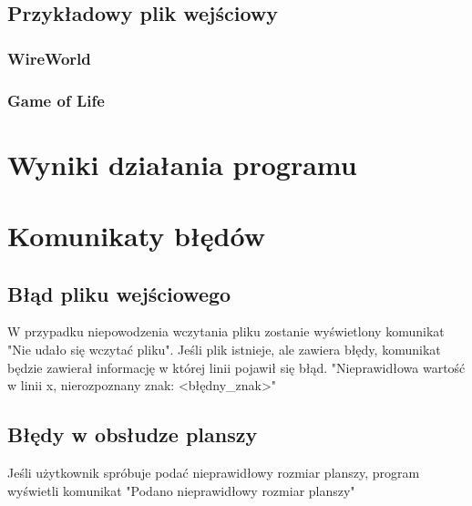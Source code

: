 \documentclass[10pt, oneside]{article}
\begin{document}
\subsection{Przykładowy plik wejściowy}
\subsubsection{WireWorld}


\subsubsection{Game of Life}

\section{Wyniki działania programu}

\section{Komunikaty błędów}
\subsection{Błąd pliku wejściowego}
W przypadku niepowodzenia wczytania pliku zostanie wyświetlony komunikat "Nie udało się wczytać pliku".
Jeśli plik istnieje, ale zawiera błędy, komunikat będzie zawierał informację w której linii pojawił się błąd. 
"Nieprawidłowa wartość w linii x, nierozpoznany znak: <błędny_znak>"
\subsection{Błędy w obsłudze planszy}
Jeśli użytkownik spróbuje podać nieprawidłowy rozmiar planszy, program wyświetli komunikat "Podano nieprawidłowy rozmiar planszy"
\end{document}

